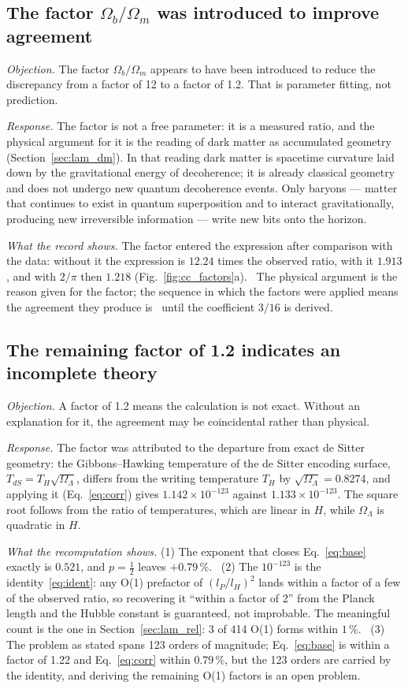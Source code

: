 \subsection{The factor $\Omega_b/\Omega_m$ was introduced to improve agreement}
\emph{Objection.} The factor $\Omega_b/\Omega_m$ appears to have been introduced to reduce the discrepancy from a factor of 12 to a
factor of 1.2. That is parameter fitting, not prediction. \openprob

\emph{Response.} The factor is not a free parameter: it is a measured ratio, and the physical argument for it is the reading of dark
matter as accumulated geometry (Section~\ref{sec:lam_dm}). In that reading dark matter is spacetime curvature laid down by the
gravitational energy of decoherence; it is already classical geometry and does not undergo new quantum decoherence events. Only
baryons --- matter that continues to exist in quantum superposition and to interact gravitationally, producing new irreversible
information --- write new bits onto the horizon. \interp

\emph{What the record shows.} The factor entered the expression after comparison with the data: without it the expression is
$12.24$ times the observed ratio, with it $1.913$, and with $2/\pi$ then $1.218$ (Fig.~\ref{fig:cc_factors}a). \calc\ The physical
argument is the reason given for the factor; the sequence in which the factors were applied means the agreement they produce is
\fitted\ until the coefficient $3/16$ is derived.

\subsection{The remaining factor of 1.2 indicates an incomplete theory}
\emph{Objection.} A factor of 1.2 means the calculation is not exact. Without an explanation for it, the agreement may be
coincidental rather than physical. \openprob

\emph{Response.} The factor was attributed to the departure from exact de Sitter geometry: the Gibbons--Hawking temperature of the de
Sitter encoding surface, $T_{dS}=T_H\sqrt{\Omega_\Lambda}$, differs from the writing temperature $T_H$ by $\sqrt{\Omega_\Lambda}=0.8274$,
and applying it (Eq.~\eqref{eq:corr}) gives $1.142\times10^{-123}$ against $1.133\times10^{-123}$. The square root follows from the
ratio of temperatures, which are linear in $H$, while $\Omega_\Lambda$ is quadratic in $H$. \derived

\emph{What the recomputation shows.} (1) The exponent that closes Eq.~\eqref{eq:base} exactly is $0.521$, and $p=\tfrac12$ leaves
$+0.79\,\%$. \calc\ (2) The $10^{-123}$ is the identity~\eqref{eq:ident}: any O(1) prefactor of $(l_P/l_H)^2$ lands within a factor
of a few of the observed ratio, so recovering it ``within a factor of 2'' from the Planck length and the Hubble constant is guaranteed,
not improbable. The meaningful count is the one in Section~\ref{sec:lam_rel}: 3 of 414 O(1) forms within $1\,\%$. \calc\ (3) The
problem as stated spans 123 orders of magnitude; Eq.~\eqref{eq:base} is within a factor of 1.22 and Eq.~\eqref{eq:corr} within
$0.79\,\%$, but the 123 orders are carried by the identity, and deriving the remaining O(1) factors is an open problem. \openprob

